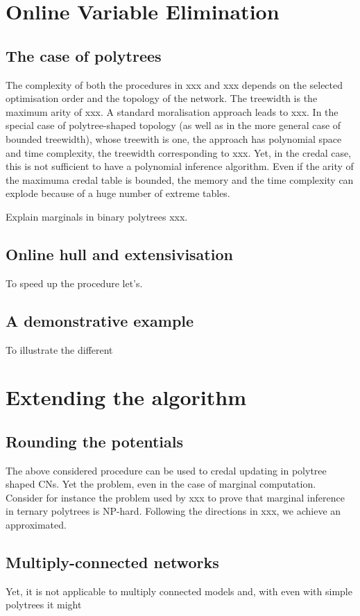 \section{Online Variable Elimination}
\subsection{The case of polytrees}

The complexity of both the procedures in xxx and xxx depends on the selected optimisation order and the topology of the network. The treewidth is the maximum arity of xxx. A standard moralisation approach leads to xxx. In the special case of polytree-shaped topology (as well as in the more general case of bounded treewidth), whose treewith is one, the approach has polynomial space and time complexity, the treewidth corresponding to xxx. Yet, in the credal case, this is not sufficient to have a polynomial inference algorithm. Even if the arity of the maximuma credal table is bounded, the memory and the time complexity can explode because of a huge number of extreme tables. 

Explain marginals in binary polytrees xxx.

\subsection{Online hull and extensivisation}
To speed up the procedure let's.


\subsection{A demonstrative example}
To illustrate the different


\section{Extending the algorithm}
\subsection{Rounding the potentials}
The above considered procedure can be used to credal updating in polytree shaped CNs. Yet the problem, even in the case of marginal computation. Consider for instance the problem used by xxx to prove that marginal inference in ternary polytrees is NP-hard. Following the directions in xxx, we achieve an approximated.
\subsection{Multiply-connected networks}
Yet, it is not applicable to multiply connected models and, with even with simple polytrees it might
